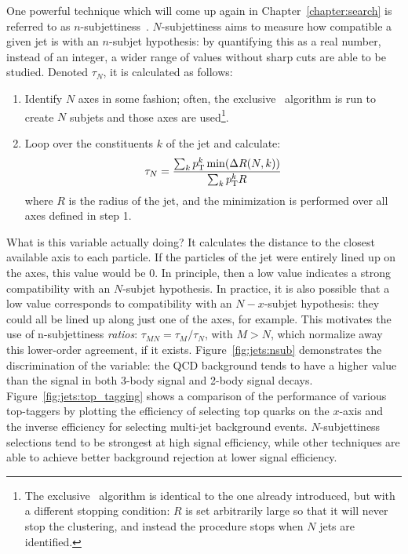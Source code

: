 One powerful technique which will come up again in Chapter~\ref{chapter:search} is referred to as $n$-subjettiness~\cite{nsub}. $N$-subjettiness aims to measure how compatible a given jet is with an $n$-subjet hypothesis: by quantifying this as a real number, instead of an integer, a wider range of values without sharp cuts are able to be studied. Denoted $\tau_N$, it is calculated as follows:
%
\begin{enumerate}
\item Identify $N$ axes in some fashion; often, the exclusive \kt\ algorithm is run to create $N$ subjets and those axes are used\footnote{The exclusive \kt\ algorithm is identical to the one already introduced, but with a different stopping condition: $R$ is set arbitrarily large so that it will never stop the clustering, and instead the procedure stops when $N$ jets are identified.}.
\item Loop over the constituents $k$ of the jet and calculate:
\begin{equation}
\tau_N = \frac{\sum_k p_{\text{T}}^k \min(\Delta R(N,k))}{\sum_k p_{\text{T}}^k R}
\end{equation}
where $R$ is the radius of the jet, and the minimization is performed over all axes defined in step 1.
\end{enumerate}
%
What is this variable actually doing? It calculates the distance to the closest available axis to each particle. If the particles of the jet were entirely lined up on the axes, this value would be 0. In principle, then a low value indicates a strong compatibility with an $N$-subjet hypothesis. In practice, it is also possible that a low value corresponds to compatibility with an $N-x$-subjet hypothesis: they could all be lined up along just one of the axes, for example. This motivates the use of n-subjettiness \textit{ratios}: $\tau_{MN} = \tau_M / \tau_N$, with $M > N$, which normalize away this lower-order agreement, if it exists. Figure~\ref{fig:jets:nsub} demonstrates the discrimination of the variable: the QCD background tends to have a higher value than the signal in both 3-body signal and 2-body signal decays. Figure~\ref{fig:jets:top_tagging} shows a comparison of the performance of various top-taggers by plotting the efficiency of selecting top quarks on the $x$-axis and the inverse efficiency for selecting multi-jet background events. $N$-subjettiness selections tend to be strongest at high signal efficiency, while other techniques are able to achieve better background rejection at lower signal efficiency.

